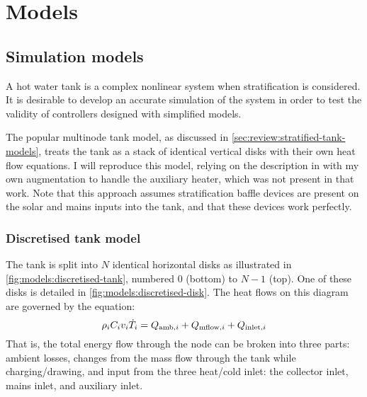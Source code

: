 \chapter{Models}
\label{ch:models}

\section{Simulation models}

A hot water tank is a complex nonlinear system when stratification is considered.
It is desirable to develop an accurate simulation of the system in order to test the validity of controllers designed with simplified models.

The popular multinode tank model, as discussed in \autoref{sec:review:stratified-tank-models}, treats the tank as a stack of identical vertical disks with their own heat flow equations.
I will reproduce this model, relying on the description in \textcite{Cristofari02} with my own augmentation to handle the auxiliary heater, which was not present in that work.
Note that this approach assumes stratification baffle devices are present on the solar and mains inputs into the tank, and that these devices work perfectly.

\subsection{Discretised tank model}

The tank is split into $N$ identical horizontal disks as illustrated in \autoref{fig:models:discretised-tank}, numbered $0$ (bottom) to $N-1$ (top).
One of these disks is detailed in \autoref{fig:models:discretised-disk}.
The heat flows on this diagram are governed by the equation:
\begin{equation}
   \label{eq:node-dT}
   \rho_i C_i v_i \dot{T}_i = Q_{\text{amb}, i} + Q_{\text{mflow}, i} + Q_{\text{inlet}, i}
\end{equation}
That is, the total energy flow through the node can be broken into three parts: ambient losses, changes from the mass flow through the tank while charging/drawing, and input from the three heat/cold inlet: the collector inlet, mains inlet, and auxiliary inlet.

